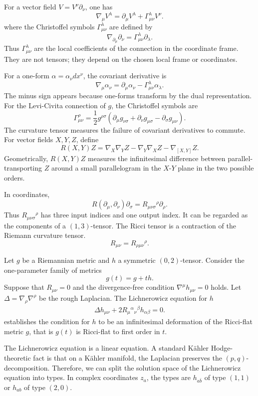 \documentclass[12pt]{article}
\begin{document}
For a vector field $V = V^\nu\partial_\nu$, one has
\[
    \nabla_\mu V^\lambda
    = \partial_\mu V^\lambda + \Gamma^\lambda_{\mu\nu}V^\nu.
\]
where the Christoffel symbols $\Gamma^\lambda_{\mu\nu}$ are defined by
\[
    \nabla_{\partial_\mu}\partial_\nu
    = \Gamma^\lambda_{\mu\nu}\partial_\lambda.
\]
Thus $\Gamma^\lambda_{\mu\nu}$ are the local coefficients of the connection in the coordinate frame. They are not tensors; they depend on the chosen local frame or coordinates.

For a one-form $\alpha = \alpha_\nu dx^\nu$, the covariant derivative is
\[
    \nabla_\mu \alpha_\nu
    = \partial_\mu \alpha_\nu - \Gamma^\lambda_{\mu\nu}\alpha_\lambda.
\]
The minus sign appears because one-forms transform by the dual representation. For the Levi-Civita connection of $g$, the Christoffel symbols are
\[
    \Gamma^\rho_{\mu\nu}
    = \frac12 g^{\rho\sigma}
    \left(
    \partial_\mu g_{\nu\sigma}
    + \partial_\nu g_{\mu\sigma}
    - \partial_\sigma g_{\mu\nu}
    \right).
\]
The curvature tensor measures the failure of covariant derivatives to commute. For vector fields $X,Y,Z$, define
\[
    R(X,Y)Z
    = \nabla_X\nabla_YZ
    - \nabla_Y\nabla_XZ
    - \nabla_{[X,Y]}Z.
\]
Geometrically, $R(X,Y)Z$ measures the infinitesimal difference between parallel-transporting $Z$ around a small parallelogram in the $X$-$Y$ plane in the two possible orders.

In coordinates,
\[
    R(\partial_\mu,\partial_\nu)\partial_\sigma
    = R_{\mu\nu\sigma}{}^\rho \partial_\rho.
\]
Thus $R_{\mu\nu\sigma}{}^\rho$ has three input indices and one output index. It can be regarded as the components of a $(1,3)$-tensor. The Ricci tensor is a contraction of the Riemann curvature tensor.
\[
    R_{\mu\nu} = R_{\rho\mu\nu}{}^\rho.
\]
\begin{claim}
    Let $g$ be a Riemannian metric and $h$ a symmetric $(0,2)$-tensor. Consider the one-parameter family of metrics
    \[
        g(t) = g + t h.
    \]
    Suppose that $R_{\mu\nu}=0$ and the divergence-free condition $\nabla^\mu h_{\mu\nu}=0$ holds. Let $\Delta = \nabla_\rho\nabla^\rho$ be the rough Laplacian. The Lichnerowicz equation for $h$ \begin{align*}
        \Delta h_{\mu\nu}
        + 2 R_\mu{}^\alpha{}_\nu{}^\beta h_{\alpha\beta}
        = 0.
    \end{align*} establishes the condition for $h$ to be an infinitesimal deformation of the Ricci-flat metric $g$, that is $g(t)$ is Ricci-flat to first order in $t$.
\end{claim}
 The Lichnerowicz equation is a linear equation. A standard Kähler Hodge-theoretic fact is that on a Kähler manifold, the Laplacian preserves the $(p,q)$-decomposition. Therefore, we can split the solution space of the Lichnerowicz equation into types. In complex coordinates $z_a$, the types are $h_{a\bar b}$ of type $(1,1)$ or $h_{ab}$ of type $(2,0)$.
\end{document}
